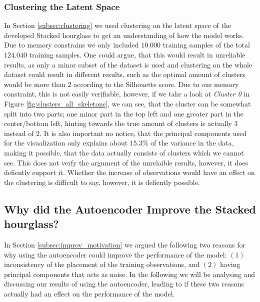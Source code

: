 \documentclass[./main.tex]{subfiles}
\begin{document}
\subsubsection{Clustering the Latent Space}
In Section \ref{subsec:clustering} we used clustering on the latent space of the developed Stacked hourglass to get an understanding of how the model works. Due to memory constrains we only included $10.000$ training samples of the total $124.040$ training samples.  One could argue, that this would result in unreliable results, as only a minor subset of the dataset is used and clustering on the whole dataset could result in different results, such as the optimal amount of clusters would be more than $2$ according to the Silhouette score. Due to our memory constraint, this is not easily verifiable, however, if we take a look at \textit{Cluster 0} in Figure \ref{fig:clusters_all_skeletons}, we can see, that the cluster can be somewhat split into two parts; one minor part in the top left and one greater part in the center/bottom left, hinting towards the true amount of clusters is actually $3$ instead of $2$. It is also important no notice, that the principal components used for the visualization only explains about $15.3\%$ of the variance in the data, making it possible, that the data actually consists of clusters which we cannot see. This does not verfy the argument of the unrelaible results, however, it does defiently support it. Whether the increase of observations would have an effect on the clustering is difficult to say, however, it is defiently possible. %

\subsection{Why did the Autoencoder Improve the Stacked hourglass?}\label{subsec:why_improvement}
In Section \ref{subsec:improv_motivation} we argued the following two reasons for why using the autoencoder could improve the performance of the model: $(1)$ inconsistency of the placement of the training observations, and $(2)$ having principal components that acts as noise. In the following we will be analysing and discussing our results of using the autoencoder, leading to if these two reasons actually had an effect on the performance of the model.
\end{document}

